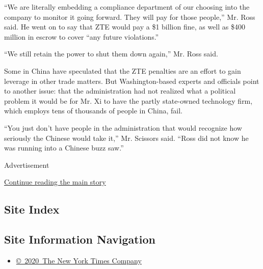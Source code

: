 ``We are literally embedding a compliance department of our choosing
into the company to monitor it going forward. They will pay for those
people,'' Mr. Ross said. He went on to say that ZTE would pay a \$1
billion fine, as well as \$400 million in escrow to cover ``any future
violations.''

``We still retain the power to shut them down again,'' Mr. Ross said.

Some in China have speculated that the ZTE penalties are an effort to
gain leverage in other trade matters. But Washington-based experts and
officials point to another issue: that the administration had not
realized what a political problem it would be for Mr. Xi to have the
partly state-owned technology firm, which employs tens of thousands of
people in China, fail.

``You just don't have people in the administration that would recognize
how seriously the Chinese would take it,'' Mr. Scissors said. ``Ross did
not know he was running into a Chinese buzz saw.''

Advertisement

\protect\hyperlink{after-bottom}{Continue reading the main story}

\hypertarget{site-index}{%
\subsection{Site Index}\label{site-index}}

\hypertarget{site-information-navigation}{%
\subsection{Site Information
Navigation}\label{site-information-navigation}}

\begin{itemize}
\tightlist
\item
  \href{https://help.nytimes.com/hc/en-us/articles/115014792127-Copyright-notice}{©~2020~The
  New York Times Company}
\end{itemize}

